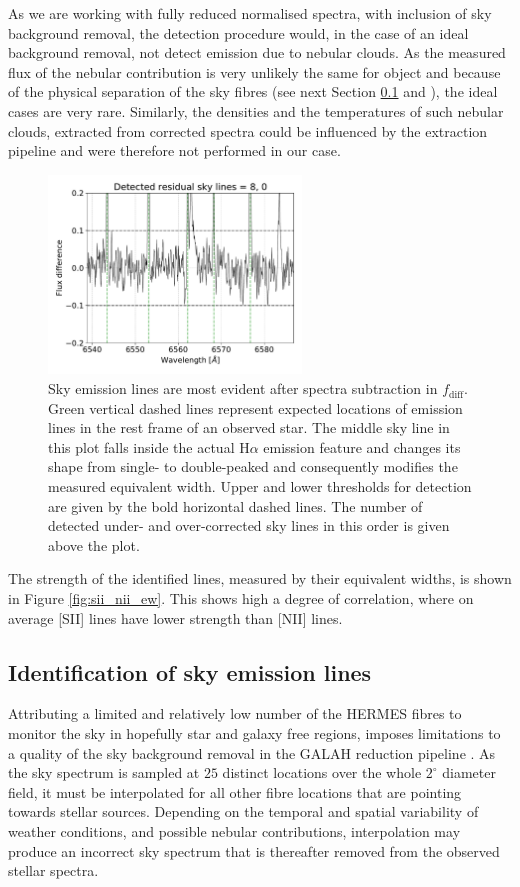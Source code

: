 As we are working with fully reduced normalised spectra, with inclusion of sky background removal, the detection procedure would, in the case of an ideal background removal, not detect emission due to nebular clouds. As the measured flux of the nebular contribution is very unlikely the same for object and because of the physical separation of the sky fibres (see next Section \ref{sec:skyemis} and \citet{2017MNRAS.464.1259K}), the ideal cases are very rare. Similarly, the densities and the temperatures of such nebular clouds, extracted from corrected spectra could be influenced by the extraction pipeline and were therefore not performed in our case. 

\begin{figure}
	\centering
	\includegraphics[width=0.6\textwidth]{paper_170509002201287_2.pdf}
	\caption{Sky emission lines are most evident after spectra subtraction in $f_\mathrm{diff}$. Green vertical dashed lines represent expected locations of emission lines in the rest frame of an observed star. The middle sky line in this plot falls inside the actual H$\alpha$ emission feature and changes its shape from single- to double-peaked and consequently modifies the measured equivalent width. Upper and lower thresholds for detection are given by the bold horizontal dashed lines. The number of detected under- and over-corrected sky lines in this order is given above the plot.}
	\label{fig:skyemiss}
\end{figure}

The strength of the identified lines, measured by their equivalent widths, is shown in Figure \ref{fig:sii_nii_ew}. This shows high a degree of correlation, where on average [SII] lines have lower strength than [NII] lines.

\subsection{Identification of sky emission lines}
\label{sec:skyemis}
Attributing a limited and relatively low number of the HERMES fibres to monitor the sky in hopefully star and galaxy free regions, imposes limitations to a quality of the sky background removal in the GALAH reduction pipeline \cite{2017MNRAS.464.1259K}. As the sky spectrum is sampled at $25$ distinct locations over the whole $2^\circ$ diameter field, it must be interpolated for all other fibre locations that are pointing towards stellar sources. Depending on the temporal and spatial variability of weather conditions, and possible nebular contributions, interpolation may produce an incorrect sky spectrum that is thereafter removed from the observed stellar spectra.

